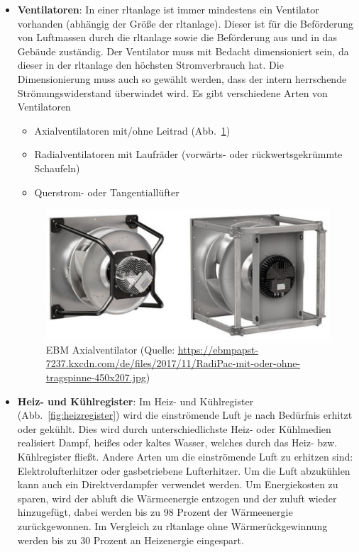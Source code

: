 \begin{itemize}
	\item \textbf{Ventilatoren}: In einer \ac{rltanlage} ist immer mindestens ein Ventilator vorhanden (abhängig der Größe der \ac{rltanlage}). Dieser ist für die Beförderung von Luftmassen durch die \ac{rltanlage} sowie die Beförderung aus und in das Gebäude zuständig. Der Ventilator muss mit Bedacht dimensioniert sein, da dieser in der \ac{rltanlage} den höchsten Stromverbrauch hat. Die Dimensionierung muss auch so gewählt werden, dass der intern herrschende Strömungswiderstand überwindet wird. Es gibt verschiedene Arten von Ventilatoren 
\begin{itemize}
	\item Axialventilatoren mit/ohne Leitrad (Abb.~\ref{fig:EBM_Axialventilator})
	\item Radialventilatoren mit Laufräder (vorwärts- oder rückwertsgekrümmte Schaufeln)
	\item Querstrom- oder Tangentiallüfter 
\end{itemize}

\begin{figure}[H]
	\centering
	\includegraphics[width=0.5\linewidth]{Bilder/axialventilator}
	\caption[EBM Axialventilator (Quelle: \url{https://ebmpapst-7237.kxcdn.com/de/files/2017/11/RadiPac-mit-oder-ohne-tragspinne-450x207.jpg}, Zugriff am 13.02.2024)]{EBM Axialventilator (Quelle: \url{https://ebmpapst-7237.kxcdn.com/de/files/2017/11/RadiPac-mit-oder-ohne-tragspinne-450x207.jpg})}
	\label{fig:EBM_Axialventilator}
\end{figure}

	\item \textbf{Heiz- und Kühlregister}: Im Heiz- und Kühlregister (Abb.~\ref{fig:heizregister}) wird die einströmende Luft je nach Bedürfnis erhitzt oder gekühlt. Dies wird durch unterschiedlichste Heiz- oder Kühlmedien realisiert \zB Dampf, heißes oder kaltes Wasser, welches durch das Heiz- bzw. Kühlregister fließt. Andere Arten um die einströmende Luft zu erhitzen sind: Elektrolufterhitzer oder gasbetriebene Lufterhitzer. Um die Luft abzukühlen kann auch ein Direktverdampfer verwendet werden.
	Um Energiekosten zu sparen, wird der \gls{abluft} die Wärmeenergie entzogen und der \gls{zuluft} wieder hinzugefügt, dabei werden bis zu 98 Prozent der Wärmeenergie zurückgewonnen. Im Vergleich zu \ac{rltanlage} ohne Wärmerückgewinnung werden bis zu 30 Prozent an Heizenergie eingespart. 


\end{itemize}
